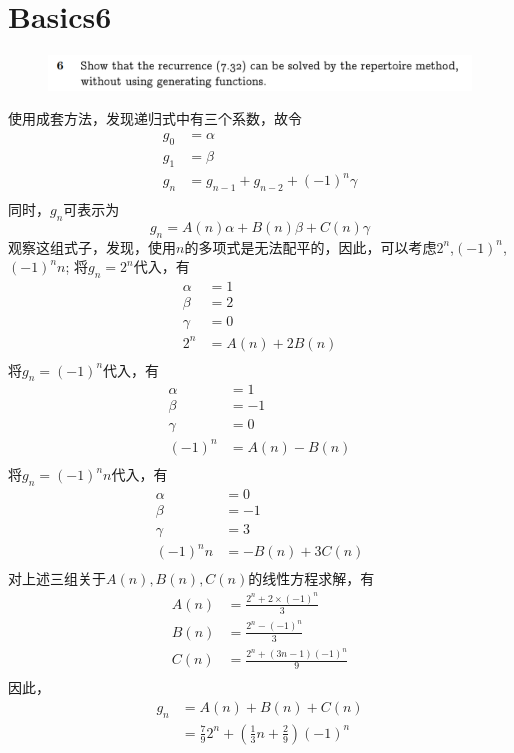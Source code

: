 \documentclass[]{article}
\begin{document}
\section*{Basics6}
\begin{figure}[H]
    \includegraphics[scale = 0.6]{2023-04-06-10-51-49.png}
\end{figure}
使用成套方法，发现递归式中有三个系数，故令
\begin{align}
    g_0 &= \alpha\\
    g_1 &= \beta\\
    g_n &= g_{n-1}+g_{n-2} + (-1)^n \gamma\\
\end{align}
同时，$g_n$可表示为
\begin{equation}
    g_n = A(n) \alpha + B(n) \beta + C(n) \gamma
\end{equation}
观察这组式子，发现，使用$n$的多项式是无法配平的，因此，可以考虑$2^n$,$(-1)^n$,$(-1)^n n$;
将$g_n = 2^n$代入，有
\begin{align}
    \alpha  &= 1\\
    \beta &= 2\\
    \gamma &= 0\\
    2^n &= A(n) + 2B(n)\\
\end{align}
将$g_n = (-1)^n$代入，有
\begin{align}
    \alpha &= 1\\
    \beta &= -1 \\
    \gamma &= 0\\
    (-1)^n &= A(n)-B(n)\\
\end{align}
将$g_n = (-1)^n n$代入，有
\begin{align}
    \alpha &= 0\\
    \beta &= -1\\
    \gamma &= 3\\
    (-1)^n n &= -B(n) + 3C(n)\\
\end{align}
对上述三组关于$A(n),B(n),C(n)$的线性方程求解，有
\begin{align}
    A(n) &= \frac{2^n + 2 \times (-1)^n}{3}\\
    B(n) &= \frac{2^n - (-1)^n}{3}\\
    C(n) &= \frac{2^n + (3n-1)(-1)^n}{9}\\
\end{align}
因此，
\begin{align}
    g_n &= A(n) + B(n) +C(n)\\
    &=\frac{7}{9}2^n + (\frac{1}{3}n + \frac{2}{9})(-1)^n
\end{align}
\end{document}
